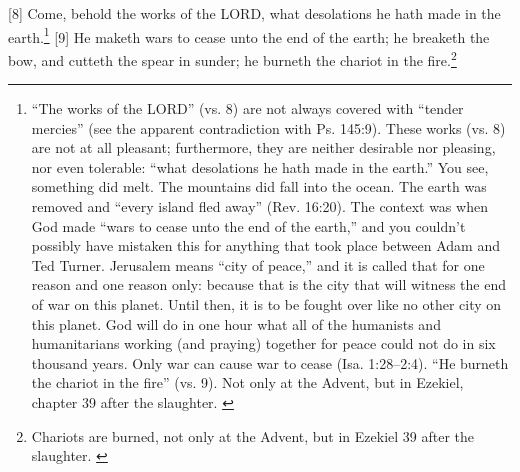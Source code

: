 [8] \textcolor[rgb]{0.00,0.00,1.00}{Come, behold the works of the LORD, what desolations he hath made in the earth.}\footnote{“The works of the LORD” (vs. 8) are not always covered with “tender mercies” (see the apparent contradiction with Ps. 145:9). These works (vs. 8) are not at all pleasant; furthermore, they are neither desirable nor pleasing, nor even tolerable: “what desolations he hath made in the earth.” You see, something did melt. The mountains did fall into the ocean. The earth was removed and “every island fled away” (Rev. 16:20). The context was when God made “wars to cease unto the end of the earth,” and you couldn’t possibly have mistaken this for anything that took place between Adam and Ted Turner. Jerusalem means “city of peace,” and it is called that for one reason and one reason only: because that is the city that will witness the end of war on this planet. Until then, it is to be fought over like no other city on this planet. God will do in one hour what all of the humanists and humanitarians working (and praying) together for peace could not do in six thousand years. Only war can cause war to cease (Isa. 1:28–2:4). “He burneth the chariot in the fire” (vs. 9). Not only at the Advent, but in Ezekiel, chapter 39 after the slaughter. \cite{Ruckman1992Psalms}} 
[9] \textcolor[rgb]{0.00,0.00,1.00}{He maketh wars to cease unto the end of the earth; he breaketh the bow, and cutteth the spear in sunder; he burneth the chariot in the fire.}\footnote{Chariots are burned, not only at the Advent, but in Ezekiel 39 after the slaughter. \cite{Ruckman1992Psalms}}
